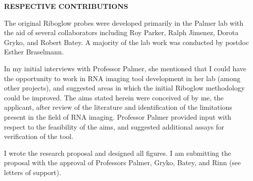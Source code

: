 \begin{center}
{\bf RESPECTIVE CONTRIBUTIONS}
\end{center}

The original Riboglow probes were developed primarily in the Palmer lab with the aid of several collaborators including Roy Parker, Ralph Jimenez, Dorota Gryko, and Robert Batey. A majority of the lab work was conducted by postdoc Esther Braselmann.

In my initial interviews with Professor Palmer, she mentioned that I could have the opportunity to work in RNA imaging tool development in her lab (among other projects), and suggested areas in which the initial Riboglow methodology could be improved. The aims stated herein were conceived of by me, the applicant, after review of the literature and identification of the limitations present in the field of RNA imaging. Professor Palmer provided input with respect to the feasibility of the aims, and suggested additional assays for verification of the tool.

I wrote the research proposal and designed all figures. I am submitting the proposal with the approval of Professors Palmer, Gryko, Batey, and Rinn (see letters of support).

